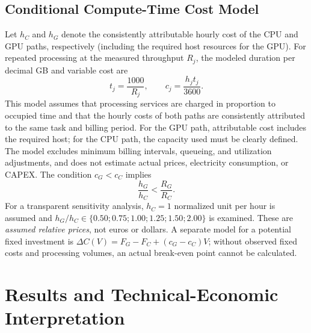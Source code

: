 \documentclass[11pt,b5paper]{article}
\begin{document}
\subsection{Conditional Compute-Time Cost Model}
Let $h_C$ and $h_G$ denote the consistently attributable hourly cost of the CPU and GPU paths, respectively (including the required host resources for the GPU). For repeated processing at the measured throughput $R_j$, the modeled duration per decimal GB and variable cost are
\begin{equation}\label{eq:cost}t_j=\frac{1000}{R_j},\qquad c_j=\frac{h_jt_j}{3600}.\end{equation}
This model assumes that processing services are charged in proportion to occupied time and that the hourly costs of both paths are consistently attributed to the same task and billing period. For the GPU path, attributable cost includes the required host; for the CPU path, the capacity used must be clearly defined. The model excludes minimum billing intervals, queueing, and utilization adjustments, and does not estimate actual prices, electricity consumption, or CAPEX. The condition $c_G<c_C$ implies
\begin{equation}\label{eq:threshold}\frac{h_G}{h_C}<\frac{R_G}{R_C}.\end{equation}
For a transparent sensitivity analysis, $h_C=1$ normalized unit per hour is assumed and $h_G/h_C\in\{0.50;0.75;1.00;1.25;1.50;2.00\}$ is examined. These are \emph{assumed relative prices}, not euros or dollars. A separate model for a potential fixed investment is $\Delta C(V)=F_G-F_C+(c_G-c_C)V$; without observed fixed costs and processing volumes, an actual break-even point cannot be calculated.

\section{Results and Technical-Economic Interpretation}
\end{document}
